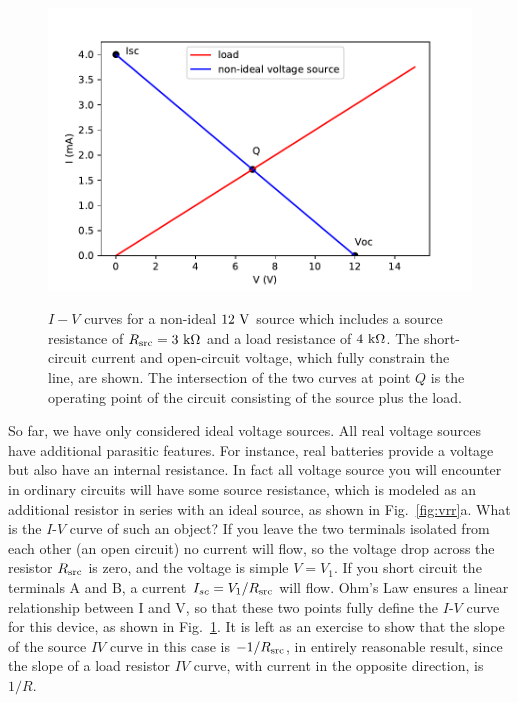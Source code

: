 \begin{figure}[htbp]
\begin{center}
\includegraphics[height=0.3\textheight]{figs/thev_nonideal.pdf} \\
\caption{ $I-V$ curves for a non-ideal $12~\rm V$ source which includes a source resistance of $R_{\rm src} = 3~\rm k\Omega$ and a load resistance of $4~\rm k\Omega$.  The short-circuit current and open-circuit voltage, which fully constrain the line, are shown.  The intersection of the two curves at point $Q$ is the operating point of the circuit consisting of the source plus the load.}
\label{fig:vrr_iv}
\end{center}
\end{figure}

So far, we have only considered ideal voltage sources.  All real voltage sources have additional parasitic features.  For instance, real batteries provide a voltage but also have an internal resistance.  In fact all voltage source you will encounter in ordinary circuits will have some source resistance, which is modeled as an additional resistor in series with an ideal source, as shown in Fig.~\ref{fig:vrr}a.  What is the $I$-$V$ curve of such an object?  If you leave the two terminals isolated from each other (an open circuit) no current will flow, so the voltage drop across the resistor $R_{\rm src}$ is zero, and the voltage is simple $V = V_1$.
If you short circuit the terminals A and B, a current $I_{sc} = V_1 / R_{\rm src}$ will flow.  Ohm's Law ensures a linear relationship between I and V, so that these two points fully define the $I$-$V$ curve for this device, as shown in Fig.~\ref{fig:vrr_iv}.  It is left as an exercise to show that the slope of the source $IV$ curve in this case is $-1/R_{\rm src}$, in entirely reasonable result, since the slope of a load resistor $IV$ curve, with current in the opposite direction, is $1/R$.

